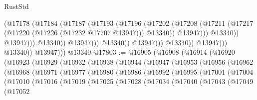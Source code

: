\begin{lexlean}{RustStd}
\begin{coremodule}
                                              (@17178
                                                (@17184
                                                  (@17187
                                                    (@17193
                                                      (@17196
                                                        (@17202
                                                          (@17208
                                                            (@17211
                                                              (@17217
                                                                (@17220
                                                                  (@17226 (@17232 @17707 @13947)))
                                                                @13340))
                                                            @13947)))
                                                      @13340))
                                                  @13947)))
                                            @13340))
                                        @13947)))
                                  @13340))
                              @13947)))
                        @13340))
                    @13947)))
              @13340))
          @13947)))
    @13340
@17803 := @16905
    (@16908
      (@16914
        (@16920
          (@16923
            (@16929
              (@16932
                (@16938
                  (@16944
                    (@16947
                      (@16953
                        (@16956
                          (@16962
                            (@16968
                              (@16971
                                (@16977
                                  (@16980
                                    (@16986
                                      (@16992
                                        (@16995
                                          (@17001
                                            (@17004
                                              (@17010
                                                (@17016
                                                  (@17019
                                                    (@17025
                                                      (@17028
                                                        (@17034
                                                          (@17040
                                                            (@17043
                                                              (@17049
                                                                (@17052

\end{coremodule}
\end{lexlean}
